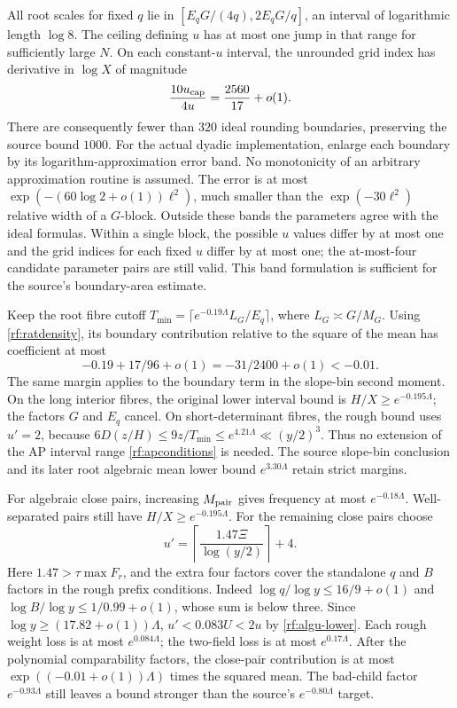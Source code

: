 All root scales for fixed $q$ lie in
$[E_qG/(4q),2E_qG/q]$, an interval of logarithmic length $\log8$.
The ceiling defining $u$ has at most one jump in that range for
sufficiently large $N$.  On each constant-$u$ interval, the
unrounded grid index has derivative in $\log X$ of magnitude
\[
 \frac{10u_{\rm cap}}{4u}=\frac{2560}{17}+o(1).
\]
There are consequently fewer than $320$ ideal rounding
boundaries, preserving the source bound $1000$.
For the actual dyadic implementation, enlarge each boundary by
its logarithm-approximation error band.  No monotonicity of an
arbitrary approximation routine is assumed.  The error is at
most $\exp(-(60\log2+o(1))\ell^2)$, much smaller than the
$\exp(-30\ell^2)$ relative width of a $G$-block.  Outside these
bands the parameters agree with the ideal formulas.  Within a
single block, the possible $u$ values differ by at most one and
the grid indices for each fixed $u$ differ by at most one; the
at-most-four candidate parameter pairs are still valid.  This
band formulation is sufficient for the source's boundary-area
estimate.

Keep the root fibre cutoff
$T_{\min}=\lceil e^{-0.19\Lambda}L_G/E_q\rceil$,
where $L_G\asymp G/M_G$.
Using \eqref{rf:ratdensity}, its boundary contribution relative to
the square of the mean has coefficient at most
\[
 -0.19+17/96+o(1)=-31/2400+o(1)<-0.01.
\]
The same margin applies to the boundary term in the slope-bin
second moment.  On the long interior fibres, the original lower
interval bound is $H/X\ge e^{-0.195\Lambda}$; the factors $G$
and $E_q$ cancel.  On short-determinant fibres, the rough bound
uses $u'=2$, because $6D(z/H)\le9z/T_{\min}\le e^{4.21\Lambda}
\ll(y/2)^3$.  Thus no extension of the AP interval range
\eqref{rf:apconditions} is needed.  The source slope-bin conclusion
and its later root algebraic mean lower bound $e^{3.30\Lambda}$
retain strict margins.

For algebraic close pairs, increasing $M_{\rm pair}$ gives
frequency at most $e^{-0.18\Lambda}$.
Well-separated pairs still have $H/X\ge e^{-0.195\Lambda}$.
For the remaining close pairs choose
\begin{equation}
 u'=\left\lceil\frac{1.47\Xi}{\log(y/2)}\right\rceil+4.
 \label{rf:roughprefix}
\end{equation}
Here $1.47>\tau\max F_r$, and the extra four factors cover the
standalone $q$ and $B$ factors in the rough prefix conditions.
Indeed $\log q/\log y\le16/9+o(1)$ and
$\log B/\log y\le1/0.99+o(1)$, whose sum is below three.
Since $\log y\ge(17.82+o(1))\Lambda$,
$u'<0.083U<2u$ by \eqref{rf:algu-lower}.
Each rough weight loss is at most $e^{0.084\Lambda}$;
the two-field loss is at most $e^{0.17\Lambda}$.
After the polynomial comparability factors, the close-pair
contribution is at most $\exp((-0.01+o(1))\Lambda)$ times the
squared mean.  The
bad-child factor $e^{-0.93\Lambda}$ still leaves a bound stronger
than the source's $e^{-0.80\Lambda}$ target.

